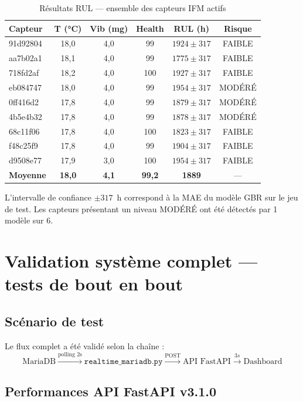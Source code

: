 \documentclass[12pt,a4paper]{report}
\begin{document}
\begin{table}[h]
\centering
\caption{Résultats RUL — ensemble des capteurs IFM actifs}
\label{tab:rul_capteurs}
\begin{tabular}{lccccc}
\toprule
\textbf{Capteur} & \textbf{T (°C)} & \textbf{Vib (mg)} & \textbf{Health} & \textbf{RUL (h)} & \textbf{Risque} \\
\midrule
91d92804 & 18,0 & 4,0 & 99 & $1924 \pm 317$ & FAIBLE \\
aa7b02a1 & 18,1 & 4,0 & 99 & $1775 \pm 317$ & FAIBLE \\
718fd2af & 18,2 & 4,0 & 100 & $1927 \pm 317$ & FAIBLE \\
eb084747 & 18,0 & 4,0 & 99 & $1954 \pm 317$ & MODÉRÉ \\
0ff416d2 & 17,8 & 4,0 & 99 & $1879 \pm 317$ & MODÉRÉ \\
4b5e4b32 & 17,8 & 4,0 & 99 & $1878 \pm 317$ & MODÉRÉ \\
68c11f06 & 17,8 & 4,0 & 100 & $1823 \pm 317$ & FAIBLE \\
f48c25f9 & 17,8 & 4,0 & 99 & $1904 \pm 317$ & FAIBLE \\
d9508e77 & 17,9 & 3,0 & 100 & $1954 \pm 317$ & FAIBLE \\
\textbf{Moyenne} & \textbf{18,0} & \textbf{4,1} & \textbf{99,2} & \textbf{1889} & — \\
\bottomrule
\end{tabular}
\end{table}

\noindent L'intervalle de confiance $\pm 317$~h correspond à la MAE du modèle GBR sur le
jeu de test. Les capteurs présentant un niveau MODÉRÉ ont été détectés par 1 modèle sur 6.

\section{Validation système complet — tests de bout en bout}

\subsection{Scénario de test}

Le flux complet a été validé selon la chaîne :
\[
\text{MariaDB} \xrightarrow{\text{polling 2s}} \texttt{realtime\_mariadb.py}
\xrightarrow{\text{POST}} \text{API FastAPI} \xrightarrow{3s} \text{Dashboard}
\]

\subsection{Performances API FastAPI v3.1.0}
\end{document}
